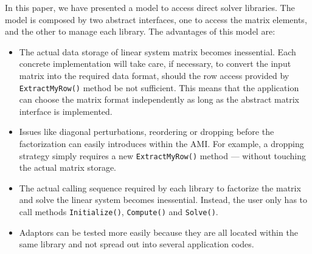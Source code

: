 \documentclass[acmtocl]{acmtrans2m}
\begin{document}
In this paper, we have presented a model to access direct
solver libraries. The model is composed by two abstract interfaces, one to
access the matrix elements, and the other to manage each library.
The advantages of this model are:
\begin{itemize}

\item The actual data storage of linear system matrix becomes inessential.
Each concrete implementation will take care, if necessary, to convert the
input matrix into the required data format, should the row access provided by
\verb!ExtractMyRow()! method be not sufficient. This means that the
application can choose the matrix format independently as long as the abstract
matrix interface is implemented.

\item Issues like diagonal perturbations, reordering or dropping before the
 factorization can easily introduces within the AMI. For example, a dropping
 strategy simply requires a new \verb!ExtractMyRow()! method --- without
 touching the actual matrix storage.

\item The actual calling sequence required by each library to factorize the
matrix and solve the linear system becomes inessential. Instead, the user only
has to call methods \verb!Initialize()!, \verb!Compute()! and
\verb!Solve()!.

\item Adaptors can be tested more easily because they are all located within
the same library and not spread out into several application codes.
\end{itemize}
\end{document}
